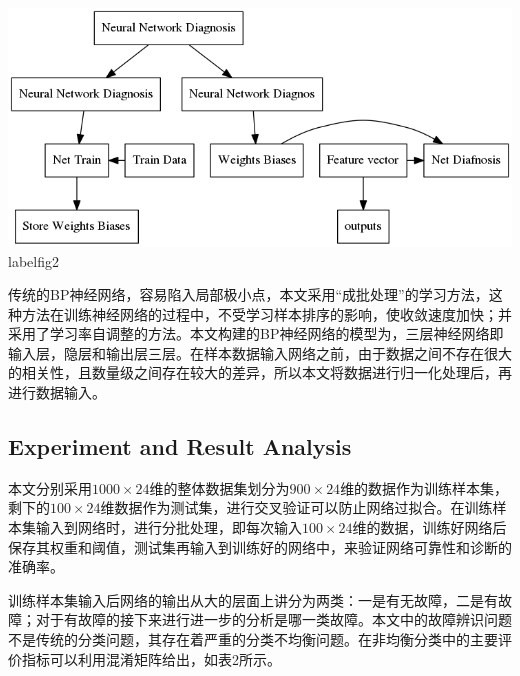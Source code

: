 \documentclass{ctacn}%
\begin{document}
\begin{multicols}{2}
\begin{center}
	\includegraphics[scale=0.3, trim=0 0 0 0]{figs/procedure}
	label{fig2}
\end{center}

传统的BP神经网络，容易陷入局部极小点，本文采用“成批处理”的学习方法，这种方法在训练神经网络的过程中，不受学习样本排序的影响，使收敛速度加快；并采用了学习率自调整的方法。本文构建的BP神经网络的模型为，三层神经网络即输入层，隐层和输出层三层。在样本数据输入网络之前，由于数据之间不存在很大的相关性，且数量级之间存在较大的差异，所以本文将数据进行归一化处理后，再进行数据输入。

\subsection{Experiment and Result Analysis}

本文分别采用$1000\times24$维的整体数据集划分为$900\times24$维的数据作为训练样本集，剩下的$100\times24$维数据作为测试集，进行交叉验证可以防止网络过拟合。在训练样本集输入到网络时，进行分批处理，即每次输入$100\times24$维的数据，训练好网络后保存其权重和阈值，测试集再输入到训练好的网络中，来验证网络可靠性和诊断的准确率。

训练样本集输入后网络的输出从大的层面上讲分为两类：一是有无故障，二是有故障；对于有故障的接下来进行进一步的分析是哪一类故障。本文中的故障辨识问题不是传统的分类问题，其存在着严重的分类不均衡问题。在非均衡分类中的主要评价指标可以利用混淆矩阵给出，如表2所示。



\end{multicols}
\end{document}
